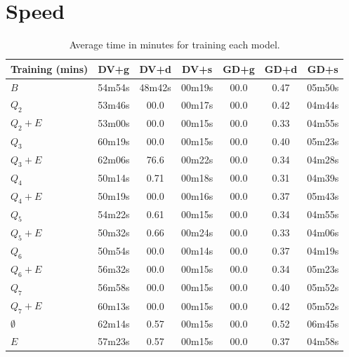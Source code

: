 \section{Speed}

\begin{table}[h]
  \centering
  \begin{tabular}{l|c|c|c|c|c|c}
    \hline
    \multicolumn{1}{c}{\bfseries Training (mins)} & \multicolumn{1}{c}{\bfseries DV+g} &
    \multicolumn{1}{c}{\bfseries DV+d} & \multicolumn{1}{c}{\bfseries DV+s} &
    \multicolumn{1}{c}{\bfseries GD+g} & \multicolumn{1}{c}{\bfseries GD+d} &
    \multicolumn{1}{c}{\bfseries GD+s}\\
    \hline
    $B$         & 54m54s & 48m42s & 00m19s & 00.0 & 0.47 & 05m50s\\
    $Q_2$       & 53m46s & 00.0   & 00m17s & 00.0 & 0.42 & 04m44s\\
    $Q_2+E$     & 53m00s & 00.0   & 00m15s & 00.0 & 0.33 & 04m55s\\
    $Q_3$       & 60m19s & 00.0   & 00m15s & 00.0 & 0.40 & 05m23s\\
    $Q_3+E$     & 62m06s & 76.6   & 00m22s & 00.0 & 0.34 & 04m28s\\
    $Q_4$       & 50m14s & 0.71   & 00m18s & 00.0 & 0.31 & 04m39s\\
    $Q_4+E$     & 50m19s & 00.0   & 00m16s & 00.0 & 0.37 & 05m43s\\
    $Q_5$       & 54m22s & 0.61   & 00m15s & 00.0 & 0.34 & 04m55s\\
    $Q_5+E$     & 50m32s & 0.66   & 00m24s & 00.0 & 0.33 & 04m06s\\
    $Q_6$       & 50m54s & 00.0   & 00m14s & 00.0 & 0.37 & 04m19s\\
    $Q_6+E$     & 56m32s & 00.0   & 00m15s & 00.0 & 0.34 & 05m23s\\
    $Q_7$       & 56m58s & 00.0   & 00m15s & 00.0 & 0.40 & 05m52s\\
    $Q_7+E$     & 60m13s & 00.0   & 00m15s & 00.0 & 0.42 & 05m52s\\
    $\emptyset$ & 62m14s & 0.57   & 00m15s & 00.0 & 0.52 & 06m45s\\
    $E$         & 57m23s & 0.57   & 00m15s & 00.0 & 0.37 & 04m58s\\
  \end{tabular}
  \caption{Average time in minutes for training each model.\label{tab:time-training}}
\end{table}

